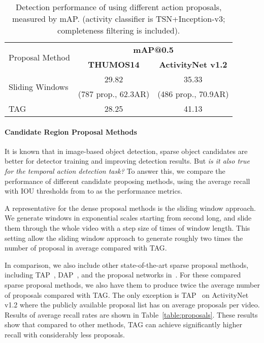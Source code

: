 \documentclass[10pt,twocolumn,letterpaper]{article}
\begin{document}
\begin{table}[h]
	\small
	\begin{center}
		\begin{tabular}{l|c|c} 
			\hline
			\multirow{2}{*}{Proposal Method} & \multicolumn{2}{c}{\textbf{mAP@0.5}} \\ \cline{2-3} 
			& \textbf{THUMOS14}         & \textbf{ActivityNet v1.2} \\ \hline
			\multirow{2}{*}{Sliding Windows}  &   29.82  &   35.33      \\
			& (787 prop., 62.3AR) & (486 prop., 70.9AR)
			\\ \hline
\hline
			TAG                                     &   28.25   &   41.13         \\ \hline
		\end{tabular}
	\end{center}
	
	\caption{Detection performance of using different action proposals, measured by mAP. (activity classifier is TSN+Inception-v3; completeness filtering is included).}
	\label{table:proposal_det}
\end{table}

\paragraph{Candidate Region Proposal Methods}
It is known that in image-based object detection, sparse object candidates are better for detector training and improving detection results. 
But {\em is it also true for the temporal action detection task?}
To answer this, we compare the performance of different candidate proposing methods,
using the average recall with IOU thresholds from  to  as the performance metrics.


A representative for the dense proposal methods is the sliding window approach. 
We generate windows in  exponential scales starting from  second long, and slide them through the whole video with a step size of  times of window length.
This setting allow the sliding window approach to generate roughly two times the number of proposal in average compared with TAG.


In comparison, we also include other state-of-the-art sparse proposal methods, including TAP~\cite{caba2016cvpr}, DAP~\cite{Escorcia2016DAP}, and the proposal networks in~\cite{Shou2016SCNN}.
For these compared sparse proposal methods, we also have them to produce twice the average number of proposals compared with TAG.
The only exception is TAP~\cite{caba2016cvpr} on ActivityNet v1.2 where the publicly available proposal list has on average  proposals per video.
Results of average recall rates are shown in Table~\ref{table:proposals}. 
These results show that
compared to other methods, TAG can achieve significantly higher recall with considerably less proposals.
\end{document}
